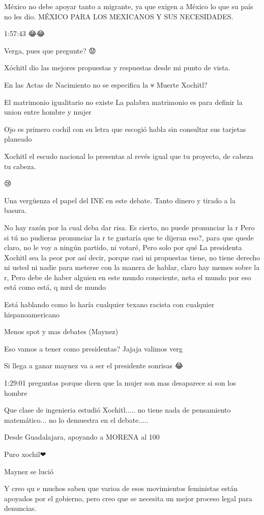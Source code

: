 México no debe apoyar tanto a migrante, ya que exigen a México  lo que su país no les dio. MÉXICO PARA LOS MEXICANOS Y SUS NECESIDADES.

1:57:43 😂😂

Verga, pues que pregunte? 😟

Xóchitl dio las mejores propuestas y respuestas desde mi punto de vista.

En las Actas de Nacimiento no se especifica la 💀 Muerte Xochitl?

El matrimonio igualitario no existe
La palabra matrimonio es para definir la union entre hombre y mujer

Ojo es primero cochil con su letra que escogió habla sin consultar sus tarjetas planeado

Xochitl el escudo nacional lo presentas al revés igual que tu proyecto, de cabeza tu cabeza.

😢🎉

Una vergüenza el papel del INE en este debate. Tanto dinero y tirado a la basura.

No hay razón por la cual deba dar risa. Es cierto, no puede pronunciar la r Pero si tú no pudieras pronunciar la r te gustaría que te dijeran eso?, para que quede claro, no le voy a ningún partido, ni votaré, Pero solo por qué La presidenta Xochitl sea la peor por así decir, porque casi ni propuestas tiene, no tiene derecho ni usted ni nadie para meterse con la manera de hablar, claro hay memes sobre la r, Pero debe de haber alguien en este mundo consciente, neta el mundo por eso está como está, q mrd de mundo

Está hablando como lo haría cualquier texano racista con cualquier hispanoamericano

Menos spot y mas debates (Maynez)

Eso vamos a tener como presidentas? Jajaja valimos verg

Si llega a ganar maynez va a ser el presidente sonrisas 😂

1:29:01 preguntas porque dicen que la mujer son mas desaparece si son los hombre

Que clase de ingenieria estudió Xochitl..... no tiene nada de pensamiento matemático... no lo demuestra en el debate.....

Desde Guadalajara, apoyando a MORENA al 100%

Puro xochil❤

Maynez se lució 🧡🧡🧡🧡

Y creo qu e muchos saben que varioa de esos movimientos feministas están apoyados por el gobierno, pero creo que se necesita un mejor proceso legal para denuncias.

